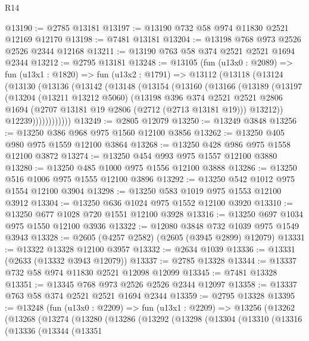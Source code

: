 \begin{lexlean}{R14}
\begin{coremodule}
@13190 := @2785 @13181
@13197 := @13190 @732 @58 @974 @11830 @2521 @12169 @12170
@13198 := @7481 @13181
@13204 := @13198 @768 @973 @2526 @2526 @2344 @12168
@13211 := @13190 @763 @58 @374 @2521 @2521 @1694 @2344
@13212 := @2795 @13181
@13248 := @13105
    (fun (u13x0 : @2089) =>
    fun (u13x1 : @1820) =>
    fun (u13x2 : @1791) =>
    @13112
      (@13118
        (@13124
          (@13130
            (@13136
              (@13142
                (@13148
                  (@13154
                    (@13160
                      (@13166
                        (@13189
                          (@13197
                            (@13204
                              (@13211 @13212 @5060)
                              (@13198
                                @396
                                @374
                                @2521
                                @2521
                                @2806
                                @1694
                                (@2707 @13181 @19 @2806 (@2712 (@2713 @13181 @19)))
                                @13212))
                            @12239))))))))))))
@13249 := @2805 @12079
@13250 := @13249 @3848
@13256 := @13250 @386 @968 @975 @1560 @12100 @3856
@13262 := @13250 @405 @980 @975 @1559 @12100 @3864
@13268 := @13250 @428 @986 @975 @1558 @12100 @3872
@13274 := @13250 @454 @993 @975 @1557 @12100 @3880
@13280 := @13250 @485 @1000 @975 @1556 @12100 @3888
@13286 := @13250 @516 @1006 @975 @1555 @12100 @3896
@13292 := @13250 @542 @1012 @975 @1554 @12100 @3904
@13298 := @13250 @583 @1019 @975 @1553 @12100 @3912
@13304 := @13250 @636 @1024 @975 @1552 @12100 @3920
@13310 := @13250 @677 @1028 @720 @1551 @12100 @3928
@13316 := @13250 @697 @1034 @975 @1550 @12100 @3936
@13322 := @12080 @3848 @732 @1039 @975 @1549 @3943
@13328 := @2605 (@4257 @2582) (@2605 (@3945 @2899) @12079)
@13331 := @13322 @13328 @12100 @3957
@13332 := @2634 @1039
@13336 := @13331 (@2633 (@13332 @3943 @12079))
@13337 := @2785 @13328
@13344 := @13337 @732 @58 @974 @11830 @2521 @12098 @12099
@13345 := @7481 @13328
@13351 := @13345 @768 @973 @2526 @2526 @2344 @12097
@13358 := @13337 @763 @58 @374 @2521 @2521 @1694 @2344
@13359 := @2795 @13328
@13395 := @13248
    (fun (u13x0 : @2209) =>
    fun (u13x1 : @2209) =>
    @13256
      (@13262
        (@13268
          (@13274
            (@13280
              (@13286
                (@13292
                  (@13298
                    (@13304
                      (@13310
                        (@13316
                          (@13336
                            (@13344
                              (@13351

\end{coremodule}
\end{lexlean}
